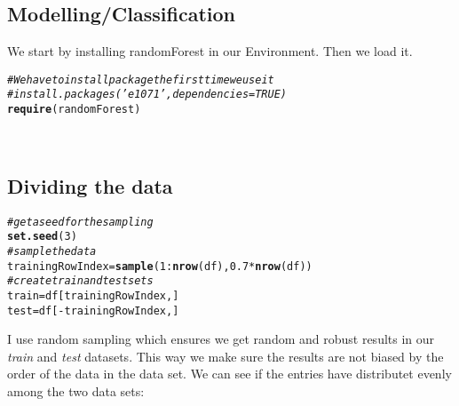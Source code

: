\documentclass{article}\usepackage[]{graphicx}\usepackage[]{color}
\makeatletter
\newcommand{\hlnum}[1]{\textcolor[rgb]{0.686,0.059,0.569}{#1}}%
\newcommand{\hlcom}[1]{\textcolor[rgb]{0.678,0.584,0.686}{\textit{#1}}}%
\newcommand{\hlopt}[1]{\textcolor[rgb]{0,0,0}{#1}}%
\newcommand{\hlstd}[1]{\textcolor[rgb]{0.345,0.345,0.345}{#1}}%
\newcommand{\hlkwb}[1]{\textcolor[rgb]{0.69,0.353,0.396}{#1}}%
\newcommand{\hlkwd}[1]{\textcolor[rgb]{0.737,0.353,0.396}{\textbf{#1}}}%
\newenvironment{kframe}{%
 \def\at@end@of@kframe{}%
 \ifinner\ifhmode%
  \def\at@end@of@kframe{\end{minipage}}%
  \begin{minipage}{\columnwidth}%
 \fi\fi%
 \def\FrameCommand##1{\hskip\@totalleftmargin \hskip-\fboxsep
 \colorbox{shadecolor}{##1}\hskip-\fboxsep
     \hskip-\linewidth \hskip-\@totalleftmargin \hskip\columnwidth}%
 \MakeFramed {\advance\hsize-\width
   \@totalleftmargin\z@ \linewidth\hsize
   \@setminipage}}%
 {\par\unskip\endMakeFramed%
 \at@end@of@kframe}
\newenvironment{knitrout}{}{} %
\makeatother
\begin{document}
\begin{itemize}
\section{Modelling/Classification}
We start by installing randomForest in our Environment. Then we load it.
\begin{knitrout}
\color{fgcolor}\begin{kframe}
\begin{alltt}
\hlcom{#We have to install package the first time we use it}
\hlcom{#install.packages('e1071', dependencies=TRUE)}
\hlkwd{require}\hlstd{(randomForest)}
\end{alltt}


{\ttfamily\noindent\itshape\color{messagecolor}{\#\# Loading required package: randomForest}}

{\ttfamily\noindent\itshape\color{messagecolor}{\#\# randomForest 4.6-12}}

{\ttfamily\noindent\itshape\color{messagecolor}{\#\# Type rfNews() to see new features/changes/bug fixes.}}\end{kframe}
\end{knitrout}
\\

\subsection{Dividing the data}
\begin{knitrout}
\color{fgcolor}\begin{kframe}
\begin{alltt}
\hlcom{#get a seed for the sampling}
\hlkwd{set.seed}\hlstd{(}\hlnum{3}\hlstd{)}
\hlcom{#sample the data}
\hlstd{trainingRowIndex} \hlkwb{=} \hlkwd{sample}\hlstd{(}\hlnum{1}\hlopt{:}\hlkwd{nrow}\hlstd{(df),} \hlnum{0.7}\hlopt{*}\hlkwd{nrow}\hlstd{(df))}
\hlcom{#create train and test sets}
\hlstd{train} \hlkwb{=} \hlstd{df[trainingRowIndex,]}
\hlstd{test} \hlkwb{=} \hlstd{df[}\hlopt{-}\hlstd{trainingRowIndex,]}
\end{alltt}
\end{kframe}
\end{knitrout}

I use random sampling which ensures we get random and robust results in our \textit{train} and \textit{test} datasets. This way we make sure the results are not biased by the order of the data in the data set. We can see if the entries have distributet evenly among the two data sets:


\end{itemize}
\end{document}
